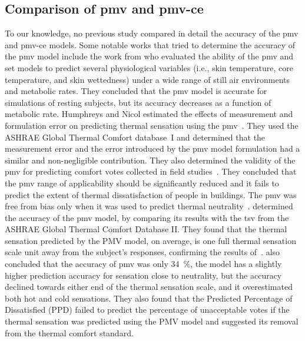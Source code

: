 \subsection{Comparison of \ac{pmv} and \ac{pmv-ce}}\label{subsec:comparision-of-pmv-formulations}
To our knowledge, no previous study compared in detail the accuracy of the \ac{pmv} and \ac{pmv-ce} models.
Some notable works that tried to determine the accuracy of the \ac{pmv} model include the work from  who evaluated the ability of the \ac{pmv} and \ac{set} models to predict several physiological variables (i.e., skin temperature, core temperature, and skin wettedness) under a wide range of still air environments and metabolic rates.
They concluded that the \ac{pmv} model is accurate for simulations of resting subjects, but its accuracy decreases as a function of metabolic rate.
Humphreys and Nicol estimated the effects of measurement and formulation error on predicting thermal sensation using the \ac{pmv}~\cite{Humphreys2000}.
They used the ASHRAE Global Thermal Comfort database~I and determined that the measurement error and the error introduced by the \ac{pmv} model formulation had a similar and non-negligible contribution.
They also determined the validity of the \ac{pmv} for predicting comfort votes collected in field studies~\cite{Humphreys2002}.
They concluded that the \ac{pmv} range of applicability should be significantly reduced and it fails to predict the extent of thermal dissatisfaction of people in buildings.
The \ac{pmv} was free from bias only when it was used to predict thermal neutrality~\cite{Humphreys2002}.
 determined the accuracy of the \ac{pmv} model, by comparing its results with the \ac{tsv} from the ASHRAE Global Thermal Comfort Database II.
They found that the thermal sensation predicted by the PMV model, on average, is one full thermal sensation scale unit away from the subject’s responses, confirming the results of~.
 also concluded that the accuracy of \ac{pmv} was only \qty{34}{\percent}, the model has a slightly higher prediction accuracy for sensation close to neutrality, but the accuracy declined towards either end of the thermal sensation scale, and it overestimated both hot and cold sensations.
They also found that the Predicted Percentage of Dissatisfied (PPD) failed to predict the percentage of unacceptable votes if the thermal sensation was predicted using the PMV model and suggested its removal from the thermal comfort standard.
